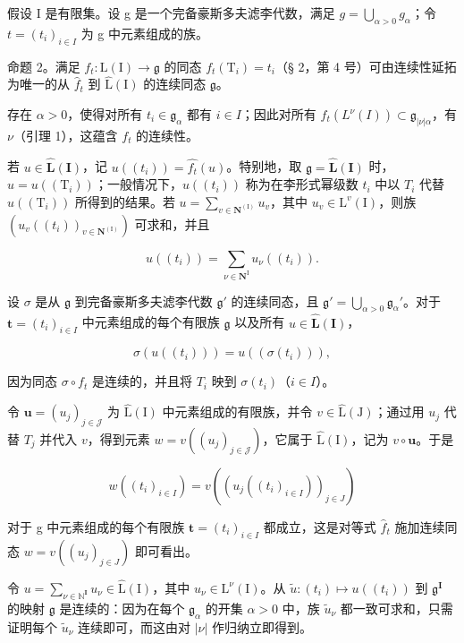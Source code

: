 假设 I 是有限集。设 g 是一个完备豪斯多夫滤李代数，满足 \(g = \bigcup_{\alpha > 0} g_{\alpha}\)；令 \(t = (t_i)_{i \in I}\) 为 g 中元素组成的族。

命题 2。满足 \(f_{t} \colon \mathrm{L}(\mathrm{I}) \to \mathfrak{g}\) 的同态 \(f_{t}(\mathrm{T}_{i}) = t_{i}\)（§ 2，第 4 号）可由连续性延拓为唯一的从 \(\hat{f}_{t}\) 到 \(\hat{\mathrm{L}}(\mathrm{I})\) 的连续同态 \(\mathfrak{g}\)。

存在 \(\alpha > 0\)，使得对所有 \(t_i \in \mathfrak{g}_\alpha\) 都有 \(i \in I\)；因此对所有 \(f_t(L^\nu(I)) \subset \mathfrak{g}_{|\nu| \alpha}\)，有 \(\nu\)（引理 1），这蕴含 \(f_t\) 的连续性。

若 \(u \in \widehat{\mathbf{L}}(\mathbf{I})\)，记 \(u((t_i)) = \widehat{f_t}(u)\)。特别地，取 \(\mathfrak{g} = \widehat{\mathbf{L}}(\mathbf{I})\) 时，\(u = u((\mathrm{T}_i))\)；一般情况下，\(u((t_i))\) 称为在李形式幂级数 \(t_i\) 中以 \(T_i\) 代替 \(u((\mathrm{T}_i))\) 所得到的结果。若 \(u = \sum_{v \in \mathbf{N}^{(\mathrm{I})}} u_v\)，其中 \(u_v \in \mathrm{L}^v(\mathrm{I})\)，则族 \((u_v((t_i))_{v \in \mathbf{N}^{(\mathrm{I})}})\) 可求和，并且

\[
u ((t _ {i})) = \sum_ {\nu \in \mathbf {N} ^ {\mathrm{I}}} u _ {\nu} ((t _ {i})).\tag{5}
\]

设 \(\sigma\) 是从 \(\mathfrak{g}\) 到完备豪斯多夫滤李代数 \(\mathfrak{g}'\) 的连续同态，且 \(\mathfrak{g}' = \bigcup_{\alpha > 0} \mathfrak{g}_{\alpha}'\)。对于 \(\boldsymbol{t} = (t_i)_{i \in I}\) 中元素组成的每个有限族 \(\mathfrak{g}\) 以及所有 \(u \in \hat{\mathbf{L}}(\mathbf{I})\)，

\[
\sigma (u ((t _ {i}))) = u ((\sigma (t _ {i}))),\tag{6}
\]

因为同态 \(\sigma \circ f_t\) 是连续的，并且将 \(T_i\) 映到 \(\sigma(t_i)\)（\(i \in I\)）。

令 \(\boldsymbol{u} = (u_j)_{j \in \mathcal{J}}\) 为 \(\hat{\mathrm{L}}(\mathrm{I})\) 中元素组成的有限族，并令 \(v \in \hat{\mathrm{L}}(\mathrm{J})\)；通过用 \(u_j\) 代替 \(T_j\) 并代入 \(v\)，得到元素 \(w = v((u_j)_{j \in \mathcal{J}})\)，它属于 \(\hat{\mathrm{L}}(\mathrm{I})\)，记为 \(v \circ \boldsymbol{u}\)。于是

\[
w ((t _ {i}) _ {i \in I}) = v ((u _ {j} ((t _ {i}) _ {i \in I})) _ {j \in J})\tag{7}
\]

对于 g 中元素组成的每个有限族 \(\boldsymbol{t} = (t_{i})_{i \in I}\) 都成立，这是对等式 \(\hat{f}_{t}\) 施加连续同态 \(w = v((u_{j})_{j \in J})\) 即可看出。

令 \(u = \sum_{\nu \in \mathbb{N}^{\mathbf{I}}} u_{\nu} \in \hat{\mathrm{L}}(\mathrm{I})\)，其中 \(u_{\nu} \in \mathrm{L}^{\nu}(\mathrm{I})\)。从 \(\tilde{u}\colon (t_i)\mapsto u((t_i))\) 到 \(\mathfrak{g}^{\mathbf{I}}\) 的映射 \(\mathfrak{g}\) 是连续的：因为在每个 \(\mathfrak{g}_{\alpha}\) 的开集 \(\alpha > 0\) 中，族 \(\tilde{u}_{\nu}\) 都一致可求和，只需证明每个 \(\tilde{u}_{\nu}\) 连续即可，而这由对 \(|\nu|\) 作归纳立即得到。

